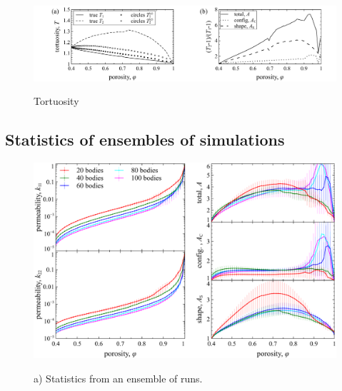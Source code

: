 \documentclass[3p]{elsarticle}
\begin{document}
\begin{figure}%
\centering \label{fig4}
\includegraphics[width = 0.99 \textwidth]{./figs/fig4.pdf}
\caption{
Tortuosity
}
\end{figure}





\subsection{Statistics of ensembles of simulations}

\begin{figure}%
\centering \label{fig5}
\includegraphics[width = 0.99 \textwidth]{./figs/fig5.pdf}
\caption{
a) Statistics from an ensemble of runs.
}
\end{figure}
\end{document}
